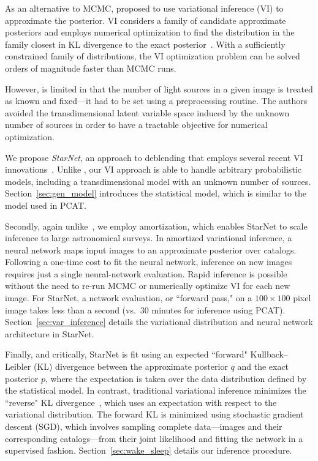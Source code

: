 As an alternative to MCMC, \cite{regier2019_celeste} proposed to use variational inference (VI)
to approximate the posterior.
VI considers a family of candidate approximate posteriors and employs numerical optimization to find the distribution in the family closest
in KL divergence to the exact posterior~\citep{Jordan_intro_vi, Wainwrite_graph_models_vi, Blei_2017_vi_review}.
With a sufficiently constrained family of distributions, the VI optimization problem can be solved orders of magnitude faster than MCMC runs.

However, \cite{regier2019_celeste} is limited in that the number of light sources in a given image is treated as known and fixed---it had to be set using a preprocessing routine.
The authors avoided the transdimensional latent variable space induced by
the unknown number of sources
in order to have a tractable objective for numerical optimization.

\bigbreak


\nopagebreak[4]

We propose {\itshape StarNet}, an approach to deblending that employs several recent VI innovations~\citep{zhang2019advances,le2020revisiting}.
Unlike \cite{regier2019_celeste}, our VI approach is able to handle arbitrary probabilistic models, including a transdimensional model with an unknown number of sources. Section~\ref{sec:gen_model} introduces the statistical model, which is similar to the model used in PCAT.

Secondly, again unlike~\cite{regier2019_celeste},
we employ amortization, which enables StarNet to scale inference to large astronomical surveys.
In amortized variational inference, a neural network maps input images to an approximate posterior over catalogs.
Following a one-time cost to fit the neural network, inference
on new images requires just a single neural-network evaluation.
Rapid inference is possible without the need to re-run MCMC or numerically optimize VI for each new image.
For StarNet, a network evaluation, or ``forward pass," on
a $100 \times 100$ pixel image takes less than a second (vs.~30 minutes for inference using PCAT).
Section~\ref{sec:var_inference} details the variational distribution and neural network architecture in StarNet.

Finally, and critically, StarNet is fit using an expected
``forward" Kullback–Leibler (KL) divergence
between the approximate posterior $q$ and the exact posterior $p$,
where the expectation is taken over the data distribution defined by the statistical model. 
In contrast, traditional variational inference minimizes the ``reverse"
KL divergence~\citep{bishop2006pattern}, 
which uses an expectation with respect to the variational distribution. 
The forward KL is minimized using stochastic gradient descent (SGD),
which involves sampling complete data---images and their corresponding catalogs---from
their joint likelihood and fitting the network in a supervised fashion.
Section~\ref{sec:wake_sleep} details our inference procedure.

